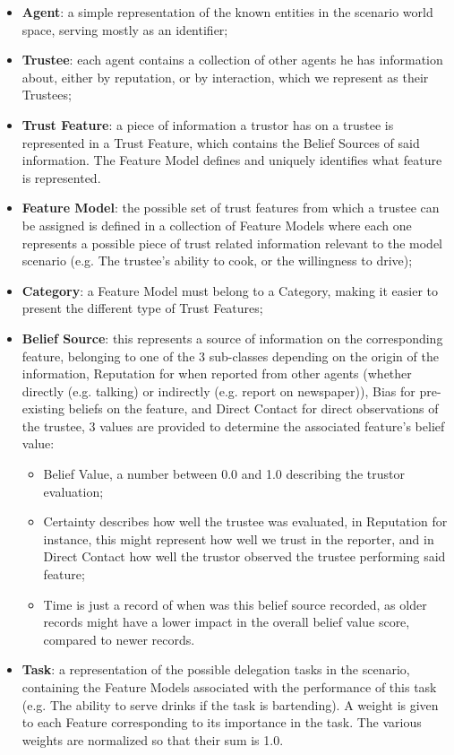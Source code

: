 \begin{itemize}
    \item \textbf{Agent}: a simple representation of the known entities in the scenario world space, serving mostly as an identifier;
    \item \textbf{Trustee}: each agent contains a collection of other agents he has information about,  either by reputation, or by interaction, which we represent as their Trustees;
    \item \textbf{Trust Feature}: a piece of information a trustor has on a trustee is represented in a Trust Feature, which contains the Belief Sources of said information. The Feature Model defines and uniquely identifies what feature is represented.
    \item \textbf{Feature Model}: the possible set of trust features from which a trustee can be assigned is defined in a collection of Feature Models where each one represents a possible piece of trust related information relevant to the model scenario (e.g. The trustee's ability to cook, or the willingness to drive);
    \item \textbf{Category}: a Feature Model must belong to a Category, making it easier to present the different type of Trust Features;
    \item \textbf{Belief Source}: this represents a source of information on the corresponding feature, belonging to one of the 3 sub-classes depending on the origin of the information, Reputation for when reported from other agents (whether directly (e.g. talking) or indirectly (e.g. report on newspaper)), Bias for pre-existing beliefs on the feature, and Direct Contact for direct observations of the trustee, 3 values are provided to determine the associated feature's belief value: 
    \begin{itemize}
        \item Belief Value, a number between 0.0 and 1.0 describing the trustor evaluation;
        \item Certainty describes how well the trustee was evaluated, in Reputation for instance, this might represent how well we trust in the reporter, and in Direct Contact how well the trustor observed the trustee performing said feature;
        \item Time is just a record of when was this belief source recorded, as older records might have a lower impact in the overall belief value score, compared to newer records.
    \end{itemize} 
    \item \textbf{Task}: a representation of the possible delegation tasks in the scenario, containing the Feature Models associated with the performance of this task (e.g. The ability to serve drinks if the task is bartending). A weight is given to each Feature corresponding to its importance in the task. The various weights are normalized so that their sum is 1.0.
\end{itemize} 

